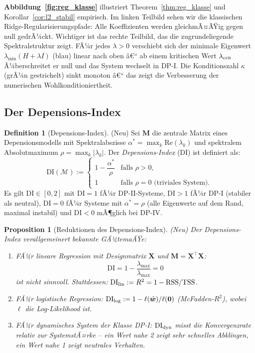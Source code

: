 ﻿\documentclass[12pt, a4paper]{article}
\newtheorem{proposition}[theorem]{Proposition}
\theoremstyle{definition}
\newtheorem{definition}[theorem]{Definition}
\theoremstyle{remark}
\newcommand{\vw}{\bm{w}}
\newcommand{\vX}{\bm{X}}
\newcommand{\T}{\top}
\newcommand{\re}{\mathrm{Re}}
\newcommand{\DI}{\mathrm{DI}}
\begin{document}
\textbf{Abbildung~\ref{fig:reg_klasse}} illustriert Theorem~\ref{thm:reg_klasse} und
Korollar~\ref{cor:l2_stabil} empirisch. Im linken Teilbild sehen wir die klassischen
Ridge-Regularisierungspfade: Alle Koeffizienten werden gleichmÃ¤ÃŸig gegen null gedrÃ¼ckt.
Wichtiger ist das rechte Teilbild, das die zugrundeliegende Spektralstruktur zeigt.
FÃ¼r jedes $\lambda > 0$ verschiebt sich der minimale Eigenwert $\lambda_{\min}(H+\lambda I)$
(blau) linear nach oben â€“ ab einem kritischen Wert $\lambda_{\rm crit}$ Ã¼berschreitet
er null und das System wechselt in DP-I. Die Konditionszahl $\kappa$ (grÃ¼n gestrichelt)
sinkt monoton â€“ das zeigt die Verbesserung der numerischen Wohlkonditioniertheit.

\subsection{Der Depensions-Index}

\begin{definition}[Depensions-Index]
\label{def:di}
\textup{(Neu)} Sei $\mathbf{M}$ die zentrale Matrix eines Depensionsmodells mit
Spektralabszisse $\alpha^* = \max_k\re(\lambda_k)$ und spektralem Absolutmaximum
$\rho = \max_k|\lambda_k|$. Der \emph{Depensions-Index} (DI) ist definiert als:
\begin{equation}
  \DI(\mathcal{M}) := \begin{cases}
    1 - \dfrac{\alpha^*}{\rho} & \text{falls } \rho > 0, \\
    1 & \text{falls } \rho = 0 \text{ (triviales System)}.
  \end{cases}
  \label{eq:di}
\end{equation}
Es gilt $\DI \in [0, 2]$ mit $\DI = 1$ fÃ¼r DP-II-Systeme, $\DI > 1$ fÃ¼r DP-I
(stabiler als neutral), $\DI = 0$ fÃ¼r Systeme mit $\alpha^* = \rho$ (alle
Eigenwerte auf dem Rand, maximal instabil) und $\DI < 0$ mÃ¶glich bei DP-IV.
\end{definition}

\begin{proposition}[Reduktionen des Depensions-Index]
\label{prop:di_reduction}
\textup{(Neu)} Der Depensions-Index verallgemeinert bekannte GÃ¼temaÃŸe:
\begin{enumerate}[label=(\roman*)]
  \item FÃ¼r lineare Regression mit Designmatrix $\vX$ und $\mathbf{M} = \vX^\T\vX$: 
    \[ \DI = 1 - \frac{\lambda_{\max}}{\lambda_{\max}} = 0 \]
    ist nicht sinnvoll. Stattdessen: $\DI_{\rm lin} := R^2 = 1 - \mathrm{RSS}/\mathrm{TSS}$.
  \item FÃ¼r logistische Regression: $\DI_{\rm log} := 1 - \ell(\hat{\vw})/\ell(\mathbf{0})$
    (McFadden-$R^2$), wobei $\ell$ die Log-Likelihood ist.
  \item FÃ¼r dynamisches System der Klasse DP-I: $\DI_{\rm dyn}$ misst die
    Konvergenzrate relativ zur SystemstÃ¤rke -- ein Wert nahe 2 zeigt sehr
    schnelles Abklingen, ein Wert nahe 1 zeigt neutrales Verhalten.
\end{enumerate}
\end{proposition}
\end{document}
